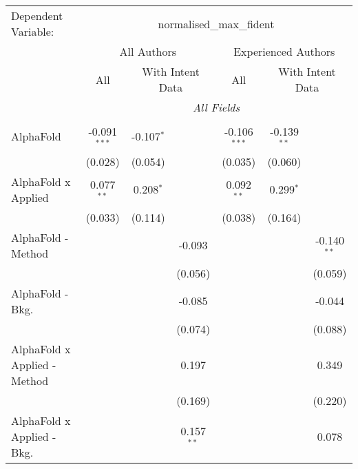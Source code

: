\begingroup
\centering
\begin{tabular}{lcccccc}
   \tabularnewline \midrule \midrule
   Dependent Variable: & \multicolumn{6}{c}{normalised\_max\_fident}\\
 & \multicolumn{3}{c}{All Authors} & \multicolumn{3}{c}{Experienced Authors} \\
\cmidrule(lr){2-4} \cmidrule(lr){5-7}
 & \multicolumn{1}{c}{All} & \multicolumn{2}{c}{With Intent Data} & \multicolumn{1}{c}{All} & \multicolumn{2}{c}{With Intent Data} \\
\cmidrule(lr){2-2} \cmidrule(lr){3-4} \cmidrule(lr){5-5} \cmidrule(lr){6-7}
 & \multicolumn{6}{c}{\textit{All Fields}} \\ \\
   AlphaFold                      & -0.091$^{***}$ & -0.107$^{*}$ &               & -0.106$^{***}$ & -0.139$^{**}$ &   \\   
                                  & (0.028)        & (0.054)      &               & (0.035)        & (0.060)       &   \\   
   AlphaFold x Applied            & 0.077$^{**}$   & 0.208$^{*}$  &               & 0.092$^{**}$   & 0.299$^{*}$   &   \\   
                                  & (0.033)        & (0.114)      &               & (0.038)        & (0.164)       &   \\   
   AlphaFold - Method             &                &              & -0.093        &                &               & -0.140$^{**}$\\   
                                  &                &              & (0.056)       &                &               & (0.059)\\   
   AlphaFold - Bkg.               &                &              & -0.085        &                &               & -0.044\\   
                                  &                &              & (0.074)       &                &               & (0.088)\\   
   AlphaFold x Applied - Method   &                &              & 0.197         &                &               & 0.349\\   
                                  &                &              & (0.169)       &                &               & (0.220)\\   
   AlphaFold x Applied - Bkg.     &                &              & 0.157$^{**}$  &                &               & 0.078\\   

\end{tabular}
